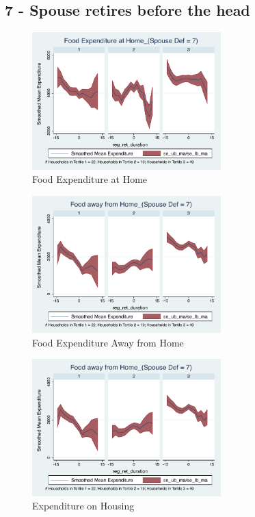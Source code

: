 \documentclass[11pt,onecolumn]{article}
\numberwithin{figure}{section}
\begin{document}
\clearpage

\subsection{7 - Spouse retires before the head}

\begin{figure}[h]
	\caption{Food Expenditure at Home}
	\centering
	\includegraphics[width=0.65\textwidth]{../ConsumptionPostRetirement_by_SpouseDef_Cats/Smoothed/7/spouse_def_total_foodexp_home_real.pdf}
\end{figure}


\begin{figure}[h]
	\caption{Food Expenditure Away from Home}
	\centering
	\includegraphics[width=0.65\textwidth]{../ConsumptionPostRetirement_by_SpouseDef_Cats/Smoothed/7/spouse_def_total_foodexp_away_real.pdf}
\end{figure}

\clearpage

\begin{figure}[h]
	\caption{Expenditure on Housing}
	\centering
	\includegraphics[width=0.65\textwidth]{../ConsumptionPostRetirement_by_SpouseDef_Cats/Smoothed/7/spouse_def_total_housing_real.pdf}
\end{figure}
\end{document}

